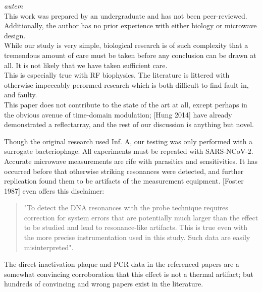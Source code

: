 \documentclass[paper.tex]{subfiles}
\begin{document}
\flushbottom 
\thispagestyle{empty}



\begin{autem}
	{\large  \it autem} \\
	
	This work was prepared by an undergraduate and has not been peer-reviewed. Additionally, the author has no prior experience with either biology or microwave design. \\

	While our study is very simple, biological research is of such complexity that a tremendous amount of care must be taken before any conclusion can be drawn at all. It is not likely that we have taken sufficient care.\\ 

This is especially true with RF biophysics. The literature is littered with otherwise impeccably perormed research which is both difficult to find fault in, and faulty. \\

This paper does not contribute to the state of the art at all, except perhaps in the obvious avenue of time-domain modulation; [Hung 2014] have already demonstrated a reflectarray, and the rest of our discussion is anything but novel.

Though the original research used Inf. A, our testing was only performed with a surrogate bacteriophage. All experiments must be repeated with SARS-NCoV-2. \\


Accurate microwave measurements are rife with parasitics and sensitivities. It has occurred before that otherwise striking resonances were detected, and further replication found them to be artifacts of the measurement equipment. [Foster 1987] even offers this disclaimer:\\

\begin{quote}

"To detect the DNA resonances with the probe
technique requires correction for system errors that are
potentially much larger than the effect to be studied and
lead to resonance-like artifacts. This is true even with the
more precise instrumentation used in this study. Such data
are easily misinterpreted".

\end{quote}

The direct inactivation plaque and PCR data in the referenced papers are a somewhat convincing corroboration that this effect is not a thermal artifact; but hundreds of convincing and wrong papers exist in the literature.\\


\end{autem}
\end{document}
